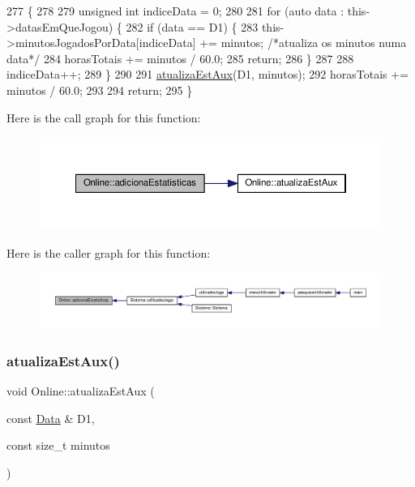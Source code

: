 \begin{DoxyCode}
277                                                                         \{
278 
279     \textcolor{keywordtype}{unsigned} \textcolor{keywordtype}{int} indiceData = 0;
280 
281     \textcolor{keywordflow}{for} (\textcolor{keyword}{auto} data : this->datasEmQueJogou) \{
282         \textcolor{keywordflow}{if} (data == D1) \{
283             this->minutosJogadosPorData[indiceData] += minutos; \textcolor{comment}{/*atualiza os minutos numa data*/}
284             horasTotais += minutos / 60.0;
285             \textcolor{keywordflow}{return};
286         \}
287 
288         indiceData++;
289     \}
290 
291     \hyperlink{classOnline_a1796bfbb1c3210f26ca8e1cddc61d830}{atualizaEstAux}(D1, minutos);
292     horasTotais += minutos / 60.0;
293 
294     \textcolor{keywordflow}{return};
295  \}
\end{DoxyCode}
Here is the call graph for this function\+:
\nopagebreak
\begin{figure}[H]
\begin{center}
\leavevmode
\includegraphics[width=350pt]{classOnline_aac2ef3483edfaa8426363ebdd542dc38_cgraph}
\end{center}
\end{figure}
Here is the caller graph for this function\+:
\nopagebreak
\begin{figure}[H]
\begin{center}
\leavevmode
\includegraphics[width=350pt]{classOnline_aac2ef3483edfaa8426363ebdd542dc38_icgraph}
\end{center}
\end{figure}
\mbox{\label{classOnline_a1796bfbb1c3210f26ca8e1cddc61d830}} 
\subsubsection{\texorpdfstring{atualiza\+Est\+Aux()}{atualizaEstAux()}}
{\footnotesize\ttfamily void Online\+::atualiza\+Est\+Aux (\begin{DoxyParamCaption}\item[{const \hyperlink{classData}{Data} \&}]{D1,  }\item[{const size\+\_\+t}]{minutos }\end{DoxyParamCaption})}




